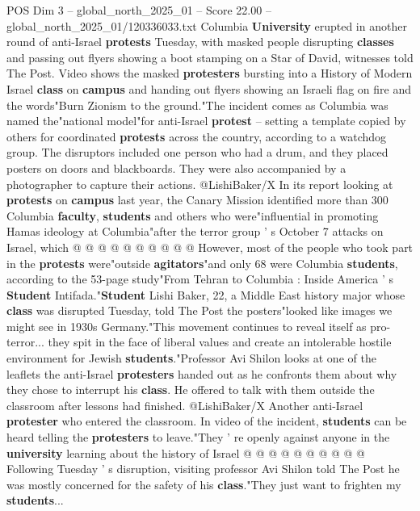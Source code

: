 \begin{textsample}{POS Dim 3 – global\_north\_2025\_01 – Score 22.00 – global\_north\_2025\_01/120336033.txt}  \label{ex:f3_pos_259}
Columbia \textbf{University} erupted in another round of anti-Israel \textbf{protests} Tuesday, with masked people disrupting \textbf{classes} and passing out flyers showing a boot stamping on a Star of David, witnesses told The Post.
Video shows the masked \textbf{protesters} bursting into a History of Modern Israel \textbf{class} on \textbf{campus} and handing out flyers showing an Israeli flag on fire and the words"Burn Zionism to the ground."The incident comes as Columbia was named the"national model"for anti-Israel \textbf{protest} -- setting a template copied by others for coordinated \textbf{protests} across the country, according to a watchdog group.
The disruptors included one person who had a drum, and they placed posters on doors and blackboards.
They were also accompanied by a photographer to capture their actions. @LishiBaker/X In its report looking at \textbf{protests} on \textbf{campus} last year, the Canary Mission identified more than 300 Columbia \textbf{faculty}, \textbf{students} and others who were"influential in promoting Hamas ideology at Columbia"after the terror group ' s October 7 attacks on Israel, which @ @ @ @ @ @ @ @ @ @ However, most of the people who took part in the \textbf{protests} were"outside \textbf{agitators}"and only 68 were Columbia \textbf{students}, according to the 53-page study"From Tehran to Columbia : Inside America ' s \textbf{Student} Intifada."\textbf{Student} Lishi Baker, 22, a Middle East history major whose \textbf{class} was disrupted Tuesday, told The Post the posters"looked like images we might see in 1930s Germany."This movement continues to reveal itself as pro-terror... they spit in the face of liberal values and create an intolerable hostile environment for Jewish \textbf{students}."Professor Avi Shilon looks at one of the leaflets the anti-Israel \textbf{protesters} handed out as he confronts them about why they chose to interrupt his \textbf{class}.
He offered to talk with them outside the classroom after lessons had finished. @LishiBaker/X Another anti-Israel \textbf{protester} who entered the classroom.
In video of the incident, \textbf{students} can be heard telling the \textbf{protesters} to leave."They ' re openly against anyone in the \textbf{university} learning about the history of Israel @ @ @ @ @ @ @ @ @ @ Following Tuesday ' s disruption, visiting professor Avi Shilon told The Post he was mostly concerned for the safety of his \textbf{class}."They just want to frighten my \textbf{students}...

\end{textsample}
